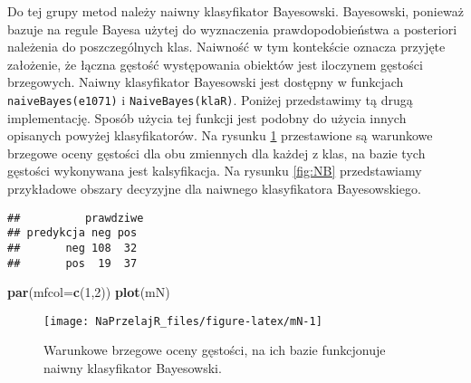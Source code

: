 \documentclass[polish,]{book}
\newenvironment{Shaded}{\begin{snugshade}}{\end{snugshade}}
\newcommand{\CommentTok}[1]{\textcolor[rgb]{0.56,0.35,0.01}{\textit{#1}}}
\newcommand{\DataTypeTok}[1]{\textcolor[rgb]{0.13,0.29,0.53}{#1}}
\newcommand{\DecValTok}[1]{\textcolor[rgb]{0.00,0.00,0.81}{#1}}
\newcommand{\KeywordTok}[1]{\textcolor[rgb]{0.13,0.29,0.53}{\textbf{#1}}}
\newcommand{\NormalTok}[1]{#1}
\newcommand{\OperatorTok}[1]{\textcolor[rgb]{0.81,0.36,0.00}{\textbf{#1}}}
\newcommand{\StringTok}[1]{\textcolor[rgb]{0.31,0.60,0.02}{#1}}
\begin{document}
Do tej grupy metod należy naiwny klasyfikator Bayesowski. Bayesowski, ponieważ bazuje na regule Bayesa użytej do wyznaczenia prawdopodobieństwa a posteriori
należenia do poszczególnych klas. Naiwność w tym kontekście oznacza przyjęte założenie, że łączna gęstość występowania obiektów jest iloczynem gęstości brzegowych.
Naiwny klasyfikator Bayesowski jest dostępny w funkcjach \texttt{naiveBayes(e1071)} i \texttt{NaiveBayes(klaR)}.
Poniżej przedstawimy tą drugą implementację.
Sposób użycia tej funkcji jest podobny do użycia innych opisanych powyżej klasyfikatorów. Na rysunku \ref{fig:mN} przestawione są warunkowe brzegowe oceny gęstości dla
obu zmiennych dla każdej z klas, na bazie tych gęstości wykonywana jest kalsyfikacja. Na rysunku \ref{fig:NB} przedstawiamy przykładowe obszary decyzyjne dla naiwnego klasyfikatora Bayesowskiego.

\begin{Shaded}
\end{Shaded}

\begin{verbatim}
##          prawdziwe
## predykcja neg pos
##       neg 108  32
##       pos  19  37
\end{verbatim}

\begin{Shaded}
\begin{Highlighting}[]
\KeywordTok{par}\NormalTok{(}\DataTypeTok{mfcol=}\KeywordTok{c}\NormalTok{(}\DecValTok{1}\NormalTok{,}\DecValTok{2}\NormalTok{))}
\KeywordTok{plot}\NormalTok{(mN)}
\end{Highlighting}
\end{Shaded}

\begin{figure}[h]

{\centering \texttt{[image: NaPrzelajR\_files/figure-latex/mN-1]} 

}

\caption{Warunkowe brzegowe oceny gęstości, na ich bazie funkcjonuje naiwny klasyfikator Bayesowski.}\label{fig:mN}
\end{figure}
\end{document}
